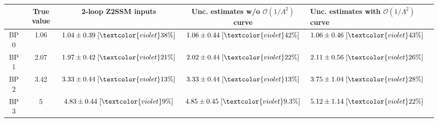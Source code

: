 \begin{tabular}{c||c|c|c}
 & True value & 2-loop Z2SSM inputs & Unc. estimates w/o $\mathcal{O}(1/\Lambda^2)$ curve & Unc. estimates with $\mathcal{O}(1/\Lambda^2)$ curve\\
\hline\hline
BP 0 & 1.06 & $1.04\pm0.39\;[\textcolor{violet}{38\%}]$ & $1.06\pm0.44\;[\textcolor{violet}{42\%}]$ & $1.06\pm0.46\;[\textcolor{violet}{43\%}]$\\\hline
BP 1 & 2.07 & $1.97\pm0.42\;[\textcolor{violet}{21\%}]$ & $2.02\pm0.44\;[\textcolor{violet}{22\%}]$ & $2.11\pm0.56\;[\textcolor{violet}{26\%}]$\\\hline
BP 2 & 3.42 & $3.33\pm0.44\;[\textcolor{violet}{13\%}]$ & $3.33\pm0.44\;[\textcolor{violet}{13\%}]$ & $3.75\pm1.04\;[\textcolor{violet}{28\%}]$\\\hline
BP 3 & 5 & $4.83\pm0.44\;[\textcolor{violet}{9\%}]$ & $4.85\pm0.45\;[\textcolor{violet}{9.3\%}]$ & $5.12\pm1.14\;[\textcolor{violet}{22\%}]$\\
\end{tabular}
